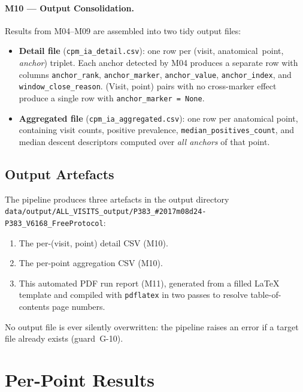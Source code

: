 \documentclass[a4paper,11pt]{article}
\begin{document}
\paragraph{M10 --- Output Consolidation.}
Results from M04--M09 are assembled into two tidy output files:
\begin{itemize}
  \item \textbf{Detail file} (\texttt{cpm\_ia\_detail.csv}): one row per
        (visit, anatomical~point, \emph{anchor}) triplet. Each anchor detected by M04
        produces a separate row with columns \texttt{anchor\_rank},
        \texttt{anchor\_marker}, \texttt{anchor\_value}, \texttt{anchor\_index},
        and \texttt{window\_close\_reason}.
        (Visit, point) pairs with no cross-marker effect produce a single row with
        \texttt{anchor\_marker = None}.
  \item \textbf{Aggregated file} (\texttt{cpm\_ia\_aggregated.csv}): one row per
        anatomical point, containing visit counts, positive prevalence,
        \texttt{median\_positives\_count}, and median descent descriptors computed over
        \emph{all anchors} of that point.
\end{itemize}

\subsection{Output Artefacts}

The pipeline produces three artefacts in the output directory \texttt{data/output/ALL\_VISITS\_output/P383\_\#2017m08d24-P383\_V6168\_FreeProtocol}:
\begin{enumerate}
  \item The per-(visit, point) detail CSV (M10).
  \item The per-point aggregation CSV (M10).
  \item This automated PDF run report (M11), generated from a filled \LaTeX{} template
        and compiled with \texttt{pdflatex} in two passes to resolve table-of-contents
        page numbers.
\end{enumerate}
No output file is ever silently overwritten: the pipeline raises an error if a target
file already exists (guard~G-10).

\section{Per-Point Results}
\end{document}
